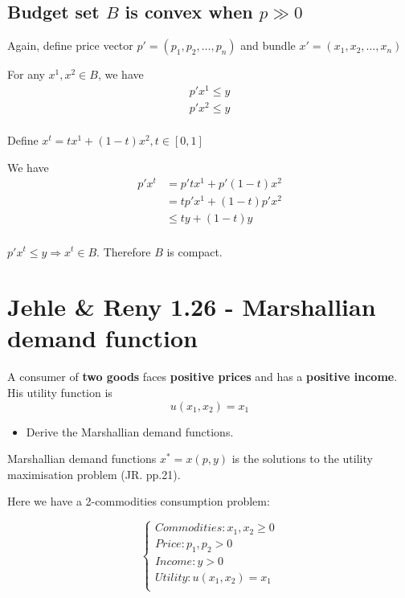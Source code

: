 \documentclass{article}
\begin{document}
\subsection{Budget set $B$ is convex when $p \gg 0$}

Again, define price vector $p' = (p_1, p_2, \ldots, p_n)$ and bundle ${x}' = (x_1, x_2, \ldots, x_n)$

For any $x^1, x^2 \in B$, we have 
\begin{align*}  
     p'x^1 \le y \\
     p'x^2 \le y \\
\end{align*}

Define $x^t = tx^1 + (1-t)x^2, t \in [0,1]$

We have 
\begin{align*}  
  p'x^t &=  p'tx^1 +  p'(1-t)x^2 \\
        &=  tp'x^1 +  (1-t)p'x^2 \\
        &\le  ty +  (1-t)y \\
\end{align*}

$p'x^t \le y \Rightarrow x^t \in B$. Therefore $B$ is compact.

\section{Jehle \& Reny 1.26 - Marshallian demand function}
A consumer of \textbf{two goods} faces \textbf{positive prices} and has a \textbf{positive income}. 
His utility function is $$u(x_1, x_2) = x_1$$ 
\begin{itemize}
\item Derive the Marshallian demand functions.
\end{itemize}

\begin{mdframed}[backgroundcolor=blue!20,linecolor=white]
Marshallian demand functions $x^* = x(p, y)$ is the solutions 
to the utility maximisation problem (JR. pp.21).
\end{mdframed}

Here we have a 2-commodities consumption problem:

\begin{equation}
  \begin{cases}
  Commodities: x_1, x_2 \ge 0 \\
  Price: p_1, p_2 > 0 \\
  Income: y > 0 \\
  Utility: u(x_1,x_2) = x_1 \\
  
  \end{cases}
\end{equation}
\end{document}
